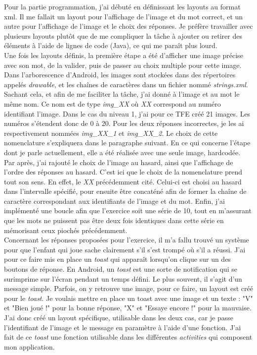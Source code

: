 Pour la partie programmation, j'ai débuté en définissant les layouts au format xml. Il me fallait un layout pour l'affichage de l'image et du mot correct, et un autre pour l'affichage de l'image et le choix des réponses. Je préfère travailler avec plusieurs layouts plutôt que de me compliquer la tâche à ajouter ou retirer des éléments à l'aide de lignes de code (Java), ce qui me paraît plus lourd.\\

 Une fois les layouts définis, la première étape a été d'afficher une image précise avec son mot, de la valider, puis de passer au choix multiple pour cette image. Dans l'arborescence d'Android, les images sont stockées dans des répertoires appelés \textit{drawable}, et les chaînes de caractères dans un fichier nommé \textit{strings.xml}. Sachant cela, et afin de me faciliter la tâche, j'ai donné à l'image et au mot le même nom. Ce nom est de type \textit{img\_XX} où \textit{XX} correspond au numéro identifiant l'image. Dans le cas du niveau 1, j'ai pour ce TFE créé 21 images. Les numéros s'étendent donc de 0 à 20. Pour les deux réponses incorrectes, je les ai respectivement nommées \textit{img\_XX\_1} et \textit{img\_XX\_2}. Le choix de cette nomenclature s'expliquera dans le paragraphe suivant. En ce qui concerne l'étape dont je parle actuellement, elle a été réalisée avec une seule image, hardcodée.\\
 
Par après, j'ai rajouté le choix de l'image au hasard, ainsi que l'affichage de l'ordre des réponses au hasard. C'est ici que le choix de la nomenclature prend tout son sens. En effet, le \textit{XX} précédemment cité. Celui-ci est choisi au hasard dans l'intervalle spécifié, pour ensuite être concaténé afin de former la chaîne de caractère correspondant aux identifiants de l'image et du mot. Enfin, j'ai implémenté une boucle afin que l'exercice soit une série de 10, tout en m'assurant que les mots ne puissent pas être deux fois identiques dans cette série en mémorisant ceux piochés précédemment.\\

Concernant les réponses proposées pour l'exercice, il m'a fallu trouvé un système pour que l'enfant qui joue sache clairement s'il s'est trompé où s'il a réussi. J'ai pour ce faire mis en place un \textit{toast} qui apparaît lorsqu'on clique sur un des boutons de réponse. En Android, un \textit{toast} est une sorte de notification qui se surimprime sur l'écran pendant un temps défini. Le plus souvent, il s'agit d'un message simple. Parfois, on y retrouve une image, pour ce faire, un layout est créé pour le \textit{toast}. Je voulais mettre en place un toast avec une image et un texte : "V" et "Bien joué !" pour la bonne réponse, "X" et "Essaye encore !" pour la mauvaise. J'ai donc créé un layout spécifique, utilisable dans les deux cas, car je passe l'identifiant de l'image et le message en paramètre à l'aide d'une fonction. J'ai fait de ce \textit{toast} une fonction utilisable dans les différentes \textit{activities} qui composent mon application.\\

